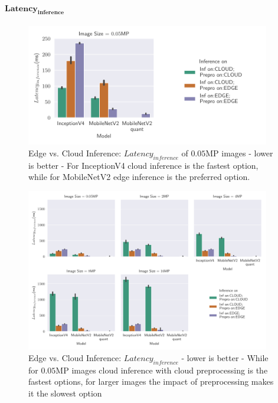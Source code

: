 \paragraph{$\mathbf{Latency_{inference}}$}

\begin{figure}[!htb]
\centering
\includegraphics[width=0.95\textwidth]{./Bilder/single_plots/edge_vs_cloud_plots/Edge_vs_Cloud_Inference_Inference_Latencies_onlyNR.pdf}
\caption[Edge vs. Cloud Inference:  $Latency_{inference}$ of $0.05$MP images - lower is better]{Edge vs. Cloud Inference:  $Latency_{inference}$ of $0.05$MP images - lower is better - For InceptionV4 cloud inference is the fastest option, while for MobileNetV2 edge inference is the preferred option.}
\label{fig:EdgeVsCloudInferenceLatNR}
\end{figure}
\begin{figure}[!htb]
\centering
\includegraphics[width=0.95\textwidth]{./Bilder/single_plots/edge_vs_cloud_plots/Edge_vs_Cloud_Inference_Inference_Latencies.pdf}
\caption[Edge vs. Cloud Inference:  $Latency_{inference}$ - lower is better]{Edge vs. Cloud Inference:  $Latency_{inference}$ - lower is better -
While for $0.05$MP images cloud inference with cloud preprocessing is the fastest options, for larger images the impact of preprocessing makes it the slowest option}
\label{fig:EdgeVsCloudInferenceLat}
\end{figure}

